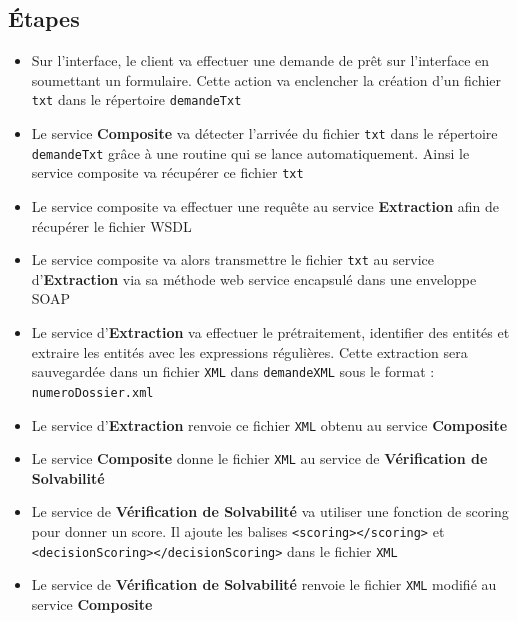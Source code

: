 \documentclass{article}
\begin{document}
	\subsection{Étapes}
	  \begin{itemize}
	  	\item Sur l’interface, le client va effectuer une demande de prêt sur l'interface en soumettant un formulaire. Cette action va enclencher la création d'un fichier \texttt{txt} dans le répertoire \texttt{demandeTxt}
	  	
	  	\item Le service \textbf{Composite} va détecter l’arrivée du fichier \texttt{txt} dans le répertoire \texttt{demandeTxt} grâce à une routine qui se lance automatiquement. Ainsi le service composite va récupérer ce fichier \texttt{txt}
	  	
	  	\item Le service composite va effectuer une requête au service \textbf{Extraction} afin de récupérer le fichier WSDL
	  	
	  	\item Le service composite va alors transmettre le fichier \texttt{txt} au service d’\textbf{Extraction} via sa méthode web service encapsulé dans une enveloppe SOAP
	  	
	  	\item Le service d’\textbf{Extraction} va effectuer le prétraitement, identifier des entités et extraire les entités avec les expressions régulières. Cette extraction sera sauvegardée dans un fichier \texttt{XML} dans \texttt{demandeXML} sous le format : \texttt{numeroDossier.xml}
	  	
	  	\item Le service d’\textbf{Extraction} renvoie ce fichier \texttt{XML} obtenu au service \textbf{Composite}
	  	
	  	\item Le service \textbf{Composite} donne le fichier \texttt{XML} au service de \textbf{Vérification de Solvabilité}
	  	
	  	\item Le service de \textbf{Vérification de Solvabilité} va utiliser une fonction de scoring pour donner un score. Il ajoute les balises \texttt{<scoring></scoring>} et \texttt{<decisionScoring></decisionScoring>} dans le fichier \texttt{XML}
	  	
	  	\item Le service de \textbf{Vérification de Solvabilité} renvoie le fichier \texttt{XML} modifié au service \textbf{Composite}
	  

\end{itemize}
\end{document}
